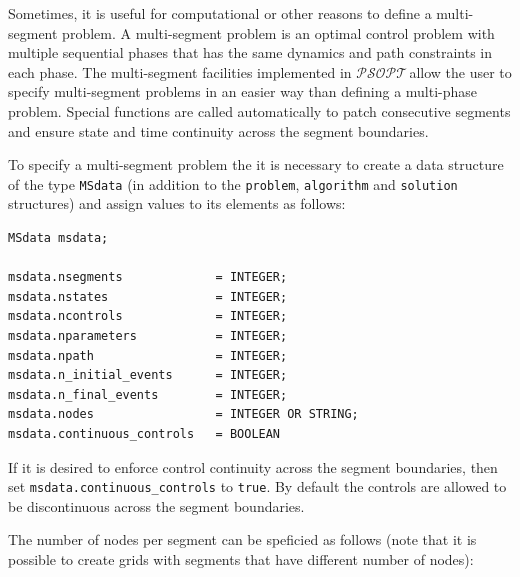 \documentclass[a4paper,11pt]{report}    %
\newcommand{\psopt}{$\mathcal{PSOPT}$\,}  %
\begin{document}
Sometimes, it is useful for computational or other reasons to define a multi-segment
problem. A multi-segment problem is  an optimal control problem with multiple sequential phases that
has the same dynamics and path constraints in each phase. The multi-segment facilities
implemented in \psopt allow the user to specify multi-segment problems in an easier
way than defining a multi-phase problem. Special functions are called automatically 
to patch consecutive segments and ensure state and time continuity across the 
segment boundaries.

To specify a multi-segment problem the it is necessary to create a data structure
of the type \verb|MSdata| (in addition to the \texttt{problem}, \texttt{algorithm} and \texttt{solution}
 structures) and assign values to its elements as follows:




\begin{verbatim}
MSdata msdata;

msdata.nsegments             = INTEGER; 
msdata.nstates               = INTEGER; 
msdata.ncontrols             = INTEGER;
msdata.nparameters           = INTEGER;
msdata.npath                 = INTEGER; 
msdata.n_initial_events      = INTEGER;
msdata.n_final_events        = INTEGER;
msdata.nodes                 = INTEGER OR STRING;
msdata.continuous_controls   = BOOLEAN
\end{verbatim}

If it is desired to enforce control continuity across the segment boundaries, then set \verb|msdata.continuous_controls| to \verb|true|. By default
the controls are allowed to be discontinuous across the segment boundaries.

The number of nodes per segment can be speficied as follows (note that it is possible to create grids with segments that have different number of nodes):
\end{document}
